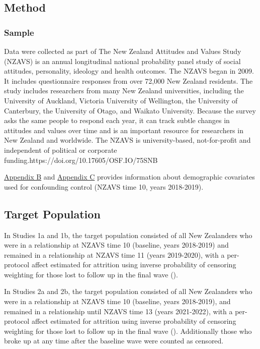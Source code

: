 \documentclass[
  single column]{article}
\begin{document}
\subsection{Method}\label{method}

\subsubsection{Sample}\label{sample}

Data were collected as part of The New Zealand Attitudes and Values
Study (NZAVS) is an annual longitudinal national probability panel study
of social attitudes, personality, ideology and health outcomes. The
NZAVS began in 2009. It includes questionnaire responses from over
72,000 New Zealand residents. The study includes researchers from many
New Zealand universities, including the University of Auckland, Victoria
University of Wellington, the University of Canterbury, the University
of Otago, and Waikato University. Because the survey asks the same
people to respond each year, it can track subtle changes in attitudes
and values over time and is an important resource for researchers in New
Zealand and worldwide. The NZAVS is university-based, not-for-profit and
independent of political or corporate
funding.https://doi.org/10.17605/OSF.IO/75SNB

\hyperref[appendix-demographics]{Appendix B} and
\hyperref[appendix-demographics-long]{Appendix C} provides information
about demographic covariates used for confounding control (NZAVS time
10, years 2018-2019).

\subsection{Target Population}\label{target-population}

In Studies 1a and 1b, the target population consisted of all New
Zealanders who were in a relationship at NZAVS time 10 (baseline, years
2018-2019) and remained in a relationship at NZAVS time 11 (years
2019-2020), with a per-protocol affect estimated for attrition using
inverse probability of censoring weighting for those lost to follow up
in the final wave ().

In Studies 2a and 2b, the target population consisted of all New
Zealanders who were in a relationship at NZAVS time 10 (baseline, years
2018-2019), and remained in a relationship until NZAVS time 13 (years
2021-2022), with a per-protocol affect estimated for attrition using
inverse probability of censoring weighting for those lost to follow up
in the final wave (). Additionally those who broke up at any time after the baseline
wave were counted as censored.
\end{document}
